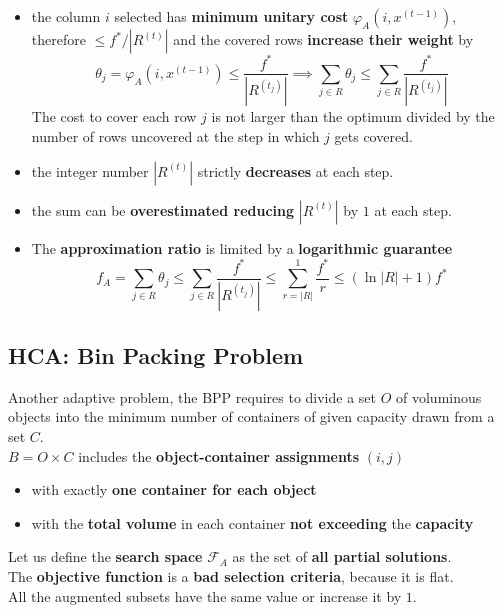 \begin{itemize}
	\item the column $i$ selected has \textbf{minimum unitary cost} $\varphi_A (i, x^{(t−1)})$, therefore $\leq f^\ast /|R^{(t)}|$ and the covered rows \textbf{increase their weight} by
	$$ \theta_j = \varphi_A (i, x^{(t-1)}) \leq \frac{f^\ast}{|R^{(t_j)}|} \implies \sum_{j \in R} \theta_j \leq \sum_{j \in R} \frac{f^\ast}{|R^{(t_j)}|} $$
	The cost to cover each row $j$ is not larger than the optimum divided by the number of rows uncovered at the step in which $j$ gets covered.\\
	
	\item the integer number $|R^{(t)}|$ strictly \textbf{decreases} at each step.\\
	
	\item the sum can be \textbf{overestimated reducing} $|R^{(t)}|$ by $1$ at each step.\\
	
	\item The \textbf{approximation ratio} is limited by a \textbf{logarithmic guarantee}
	$$ f_A = \sum_{j \in R} \theta_j \leq \sum_{j \in R} \frac{f^\ast}{|R^{(t_j)}|} \leq \sum_{r=|R|}^1 \frac{f^\ast}{r} \leq \left(\ln |R| + 1\right) f^\ast $$
\end{itemize}

\newpage

\subsection{HCA: Bin Packing Problem}
Another adaptive problem, the BPP requires to divide a set $O$ of voluminous objects into the minimum number of containers of given capacity drawn from a set $C$.\\

$B = O \times C$ includes the \textbf{object-container assignments} $(i, j)$
\begin{itemize}
	\item with exactly \textbf{one container for each object}
	\item with the \textbf{total volume} in each container \textbf{not exceeding} the \textbf{capacity}
\end{itemize}

Let us define the \textbf{search space} $\mathcal{F}_A$ as the set of \textbf{all partial solutions}.\\

The \textbf{objective function} is a \textbf{bad selection criteria}, because it is flat.\\
All the augmented subsets have the same value or increase it by $1$.\\


